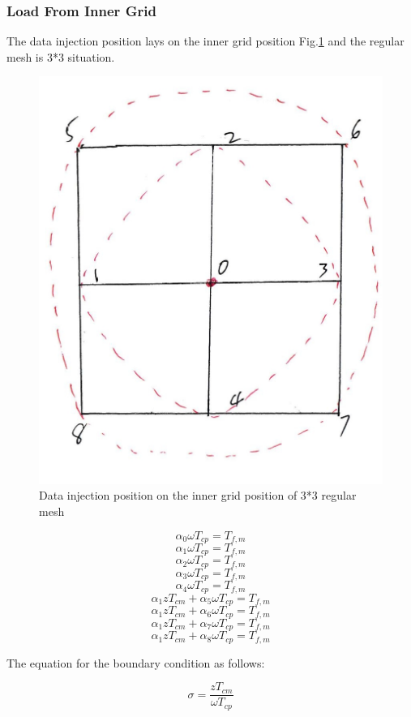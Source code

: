 \vspace*{50pt}

\subsubsection{Load From Inner Grid}
\vspace*{5pt}
The data injection position lays on the inner grid position Fig.\ref{i33f} and the regular mesh is 3*3 situation.

\begin{figure}[h]
\centering\includegraphics[width= 0.7\linewidth]{figure/i33_f}
\caption{Data injection position on the inner grid position of 3*3 regular mesh}
\label{i33f}
\end{figure}

$$\alpha_{0} \omega T_{cp} = T_{f,m}$$ 
$$\alpha_{1} \omega T_{cp} = T_{f,m}$$
$$\alpha_{2} \omega T_{cp} = T_{f,m}$$
$$\alpha_{3} \omega T_{cp} = T_{f,m}$$
$$\alpha_{4} \omega T_{cp} = T_{f,m}$$
$$\alpha_{1}zT_{cm} + \alpha_{5}\omega T_{cp} = T_{f,m}$$
$$\alpha_{1}zT_{cm} + \alpha_{6}\omega T_{cp} = T_{f,m}$$
$$\alpha_{1}zT_{cm} + \alpha_{7}\omega T_{cp} = T_{f,m}$$
$$\alpha_{1}zT_{cm} + \alpha_{8}\omega T_{cp} = T_{f,m}$$

The equation for the boundary condition as follows:

$$\sigma = \frac{zT_{cm}}{\omega T_{cp}}$$

\vspace*{20pt}


